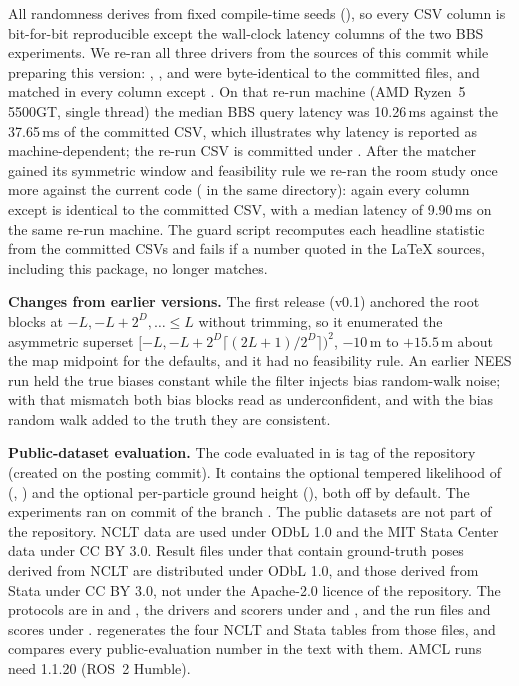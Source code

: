 \noindent All randomness derives from fixed compile-time seeds (), so every CSV column is bit-for-bit reproducible except the wall-clock  latency columns of the two BBS experiments. We re-ran all three drivers from the sources of this commit while preparing this version: , , and  were byte-identical to the committed files, and  matched in every column except . On that re-run machine (AMD Ryzen~5 5500GT, single thread) the median BBS query latency was 10.26\,ms against the 37.65\,ms of the committed CSV, which illustrates why latency is reported as machine-dependent; the re-run CSV is committed under . After the matcher gained its symmetric window and feasibility rule we re-ran the room study once more against the current code ( in the same directory): again every column except  is identical to the committed CSV, with a median latency of 9.90\,ms on the same re-run machine. The guard script  recomputes each headline statistic from the committed CSVs and fails if a number quoted in the \LaTeX{} sources, including this package, no longer matches.

\noindent\textbf{Changes from earlier versions.} The first release (v0.1) anchored the root blocks at $-L,-L+2^D,\dots\le L$ without trimming, so it enumerated the asymmetric superset $[-L,-L+2^D\lceil(2L+1)/2^D\rceil)^2$, $-10$\,m to $+15.5$\,m about the map midpoint for the defaults, and it had no feasibility rule. An earlier NEES run held the true biases constant while the filter injects bias random-walk noise; with that mismatch both bias blocks read as underconfident, and with the bias random walk added to the truth they are consistent.

\noindent\textbf{Public-dataset evaluation.} The code evaluated in  is tag  of the repository (created on the posting commit). It contains the optional tempered likelihood of  (, ) and the optional per-particle ground height (), both off by default. The experiments ran on commit  of the branch . The public datasets are not part of the repository. NCLT data are used under ODbL 1.0 and the MIT Stata Center data under CC BY 3.0. Result files under  that contain ground-truth poses derived from NCLT are distributed under ODbL 1.0, and those derived from Stata under CC BY 3.0, not under the Apache-2.0 licence of the repository. The protocols are in  and , the drivers and scorers under  and , and the run files and scores under .  regenerates the four NCLT and Stata tables from those files, and  compares every public-evaluation number in the text with them. AMCL runs need  1.1.20 (ROS~2 Humble).

